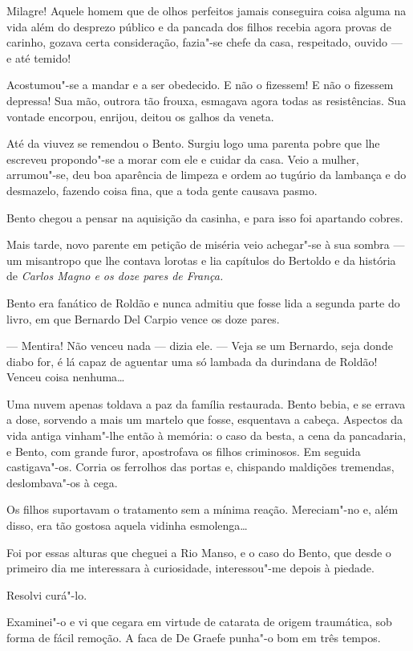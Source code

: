 Milagre! Aquele homem que de olhos perfeitos jamais conseguira coisa
alguma na vida além do desprezo público e da pancada dos filhos recebia
agora provas de carinho, gozava certa consideração, fazia"-se chefe da
casa, respeitado, ouvido --- e até temido!

Acostumou"-se a mandar e a ser obedecido. E não o fizessem! E não o
fizessem depressa! Sua mão, outrora tão frouxa, esmagava agora todas as
resistências. Sua vontade encorpou, enrijou, deitou os galhos da veneta.

Até da viuvez se remendou o Bento. Surgiu logo uma parenta pobre que lhe
escreveu propondo"-se a morar com ele e cuidar da casa. Veio a mulher,
arrumou"-se, deu boa aparência de limpeza e ordem ao tugúrio da lambança
e do desmazelo, fazendo coisa fina, que a toda gente causava pasmo.

Bento chegou a pensar na aquisição da casinha, e para isso foi apartando
cobres.

Mais tarde, novo parente em petição de miséria veio achegar"-se à sua
sombra --- um misantropo que lhe contava lorotas e lia capítulos do
Bertoldo e da história de \emph{Carlos Magno e os doze pares de França.}

Bento era fanático de Roldão e nunca admitiu que fosse lida a segunda
parte do livro, em que Bernardo Del Carpio vence os doze pares.

--- Mentira! Não venceu nada --- dizia ele. --- Veja se um Bernardo,
seja donde diabo for, é lá capaz de aguentar uma só lambada da durindana
de Roldão! Venceu coisa nenhuma\ldots{}

Uma nuvem apenas toldava a paz da família restaurada. Bento bebia, e se
errava a dose, sorvendo a mais um martelo que fosse, esquentava a
cabeça. Aspectos da vida antiga vinham"-lhe então à memória: o caso da
besta, a cena da pancadaria, e Bento, com grande furor, apostrofava os
filhos criminosos. Em seguida castigava"-os. Corria os ferrolhos das
portas e, chispando maldições tremendas, deslombava"-os à cega.

Os filhos suportavam o tratamento sem a mínima reação. Mereciam"-no e,
além disso, era tão gostosa aquela vidinha esmolenga\ldots{}

Foi por essas alturas que cheguei a Rio Manso, e o caso do Bento, que
desde o primeiro dia me interessara à curiosidade, interessou"-me depois
à piedade.

Resolvi curá"-lo.

Examinei"-o e vi que cegara em virtude de catarata de origem traumática,
sob forma de fácil remoção. A faca de De Graefe punha"-o bom em três
tempos.

